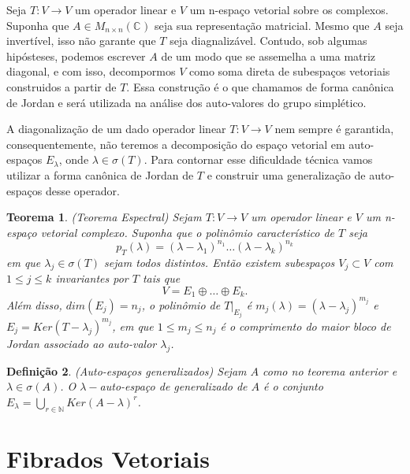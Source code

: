 \documentclass[12pt]{book}
\newtheorem{teorema}{Teorema}[section]
\newtheorem{definicao}[teorema]{Definição}
\newcommand{\autoespaco}[1]{E_{#1}}
\newcommand{\complexo}[1]{\mathbb{C}^{#1}}
\newcommand{\espectrooperador}[1]{\sigma(#1)}
\newcommand{\matrizquadcomplexa}[1]{M_{#1 \times #1}(\complexo{})}
\begin{document}
	Seja $T:V\to V$ um operador linear e $V$ um n-espaço vetorial sobre os complexos. Suponha que $A \in \matrizquadcomplexa{n}$ seja sua representação matricial. Mesmo que $A$ seja invertível, isso não garante que $T$ seja diagnalizável. Contudo, sob algumas hipósteses, podemos escrever $A$ de um modo que se assemelha a uma matriz diagonal, e com isso, decompormos $V$ como soma direta de subespaços vetoriais construidos a partir de $T$. Essa construção é o que chamamos de forma canônica de Jordan e será utilizada na análise dos auto-valores do grupo simplético.
	
	A diagonalização de um dado operador linear $T:V\to V$ nem sempre é garantida, consequentemente, não teremos a decomposição do espaço vetorial em auto-espaços $\autoespaco{\lambda}$, onde $\lambda\in \espectrooperador{T}$. Para contornar esse dificuldade técnica vamos utilizar a forma canônica de Jordan de $T$ e construir uma generalização de auto-espaços desse operador.
	
	\begin{teorema}\label{teorema_espectral_jordan}
		(Teorema Espectral) Sejam $T:V \to V$ um operador linear e $V$ um n-espaço vetorial complexo. Suponha que o polinômio característico de $T$ seja
		$$
		p_{T}(\lambda) = (\lambda - \lambda_{1})^{n_{1}}\dots (\lambda - \lambda_{k})^{n_{k}}
		$$
		em que $\lambda_{j} \in \sigma(T)$ sejam todos distintos. Então existem subespaços $V_{j} \subset V$ com $1\leq j \leq k$ invariantes por $T$ tais que 
		$$
		V = E_{1}\oplus \dots \oplus E_{k}.
		$$
		Além disso, $dim(E_{j}) = n_{j}$,  o polinômio de $T|_{E_{j}}$ é $m_{j}(\lambda) = (\lambda - \lambda_{j})^{m_{j}}$ e $E_{j} = Ker(T-\lambda_{j})^{m_{j}}$, em que $1\leq m_{j}\leq n_{j}$ é o comprimento do maior bloco de Jordan associado ao auto-valor $\lambda_{j}$.
	\end{teorema}
	
	\begin{definicao}\label{definicao_autoespaco_generalizado}
		(Auto-espaços generalizados) Sejam $A$ como no teorema anterior e $\lambda \in \sigma(A)$. O $\lambda-$auto-espaço de generalizado de $A$ é o conjunto $E_{\lambda} = \bigcup_{r \in \mathbb{N}} Ker(A - \lambda)^{r}$.
	\end{definicao}
	
	\chapter{Fibrados Vetoriais}\label{apendice_fibrados}
	
\end{document}
